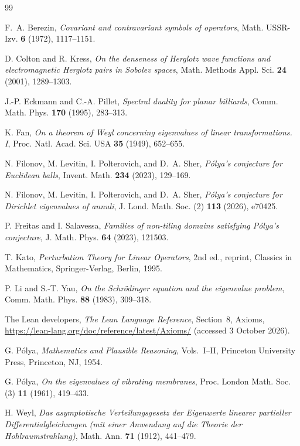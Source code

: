 \documentclass[11pt]{amsart}
\numberwithin{equation}{section}
\begin{document}
\begin{thebibliography}{99}

F.~A. Berezin,
\emph{Covariant and contravariant symbols of operators},
Math. USSR-Izv. \textbf{6} (1972), 1117--1151.

D. Colton and R. Kress,
\emph{On the denseness of Herglotz wave functions and electromagnetic
Herglotz pairs in Sobolev spaces},
Math. Methods Appl. Sci. \textbf{24} (2001), 1289--1303.

J.-P. Eckmann and C.-A. Pillet,
\emph{Spectral duality for planar billiards},
Comm. Math. Phys. \textbf{170} (1995), 283--313.

K. Fan,
\emph{On a theorem of Weyl concerning eigenvalues of linear
transformations. I},
Proc. Natl. Acad. Sci. USA \textbf{35} (1949), 652--655.

N. Filonov, M. Levitin, I. Polterovich, and D.~A. Sher,
\emph{P\'olya's conjecture for Euclidean balls},
Invent. Math. \textbf{234} (2023), 129--169.

N. Filonov, M. Levitin, I. Polterovich, and D.~A. Sher,
\emph{P\'olya's conjecture for Dirichlet eigenvalues of annuli},
J. Lond. Math. Soc. (2) \textbf{113} (2026), e70425.

P. Freitas and I. Salavessa,
\emph{Families of non-tiling domains satisfying P\'olya's conjecture},
J. Math. Phys. \textbf{64} (2023), 121503.

T. Kato,
\emph{Perturbation Theory for Linear Operators},
2nd ed., reprint, Classics in Mathematics,
Springer-Verlag, Berlin, 1995.

P. Li and S.-T. Yau,
\emph{On the Schr\"odinger equation and the eigenvalue problem},
Comm. Math. Phys. \textbf{88} (1983), 309--318.

The Lean developers,
\emph{The Lean Language Reference}, Section~8, Axioms,
\url{https://lean-lang.org/doc/reference/latest/Axioms/}
(accessed 3 October 2026).

G. P\'olya,
\emph{Mathematics and Plausible Reasoning},
Vols.~I--II, Princeton University Press, Princeton, NJ, 1954.

G. P\'olya,
\emph{On the eigenvalues of vibrating membranes},
Proc. London Math. Soc. (3) \textbf{11} (1961), 419--433.

H. Weyl,
\emph{Das asymptotische Verteilungsgesetz der Eigenwerte linearer
partieller Differentialgleichungen (mit einer Anwendung auf die
Theorie der Hohlraumstrahlung)},
Math. Ann. \textbf{71} (1912), 441--479.

\end{thebibliography}
\end{document}
